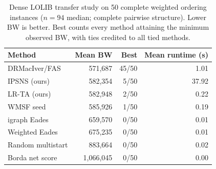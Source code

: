 \begin{table}[t]
\centering
\footnotesize
\caption{Dense LOLIB transfer study on 50 complete weighted ordering instances (\(n=94\) median; complete pairwise structure). Lower BW is better. Best counts every method attaining the minimum observed BW, with ties credited to all tied methods.}
\label{tab:lolib-scope}
\begin{tabularx}{\textwidth}{@{}>{\raggedright\arraybackslash}X r r r@{}}
\toprule
Method & Mean BW & Best & Mean runtime (s) \\
\midrule
DRMacIver/FAS & 571,687 & 45/50 & 1.01 \\
IPSNS (ours) & 582,354 & 5/50 & 37.92 \\
LR-TA (ours) & 582,948 & 2/50 & 0.22 \\
WMSF seed & 585,926 & 1/50 & 0.19 \\
igraph Eades & 659,570 & 0/50 & 0.01 \\
Weighted Eades & 675,235 & 0/50 & 0.01 \\
Random multistart & 883,664 & 0/50 & 0.02 \\
Borda net score & 1,066,045 & 0/50 & 0.00 \\
\bottomrule
\end{tabularx}
\end{table}
